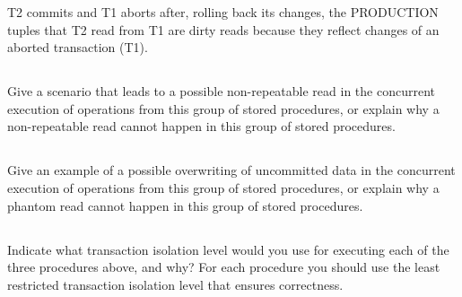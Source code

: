 T2 commits and T1 aborts after, rolling back its changes, the PRODUCTION tuples that T2 read from T1 are dirty reads because they reflect changes of an aborted transaction (T1). 

\subsection{}
{\color{gray}Give a scenario that leads to a possible non-repeatable read in the concurrent execution of operations from this group of stored procedures, or explain why a non-repeatable read cannot happen in this group of stored procedures.}

\subsection{}
{\color{gray}Give an example of a possible overwriting of uncommitted data in the concurrent execution of operations from this group of stored procedures, or explain why a phantom read cannot happen in this group of stored procedures.}

\subsection{}
{\color{gray}Indicate what transaction isolation level would you use for executing each of the three procedures above, and why? For each procedure you should use the least restricted transaction isolation level that ensures correctness.}
